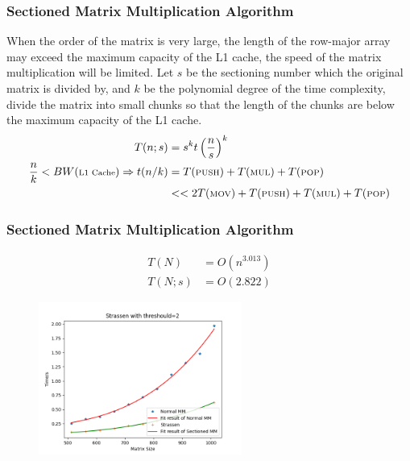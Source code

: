 \documentclass[cjk]{beamer}
\begin{document}
\begin{frame}
  \frametitle{Sectioned Matrix Multiplication Algorithm}
  When the order of the matrix is very large, the length of the row-major array may exceed the maximum capacity of the L1 cache, the speed of the matrix multiplication will be limited. Let \(s\) be the sectioning number which the original matrix is divided by, and \(k\) be the polynomial degree of the time complexity, divide the matrix into small chunks so that the length of the chunks are below the maximum capacity of the L1 cache.
  \begin{equation}
    \begin{aligned}
      T(n;s)                                                        & =s^{k}t\left(\frac{n}{s}\right)^{k}                                                                         \\
      \frac{n}{k}<BW(\text{\scriptsize L1 Cache})\Rightarrow t(n/k) & =T(\text{\scriptsize PUSH})+T(\text{\scriptsize MUL})+T(\text{\scriptsize POP})                             \\
                                                                    & <<2T(\text{\scriptsize MOV})+T(\text{\scriptsize PUSH})+T(\text{\scriptsize MUL})+T(\text{\scriptsize POP})
    \end{aligned}
  \end{equation}
\end{frame}
\begin{frame}
  \frametitle{Sectioned Matrix Multiplication Algorithm}

  \begin{equation}
    \begin{aligned}
      T(N)   & =O(n^{3.013}) \\
      T(N;s) & =O(2.822)
    \end{aligned}
  \end{equation}
  \begin{figure}[htb]
    \begin{center}
      \includegraphics[height=5.0cm]{sub_naive.png}
    \end{center}
  \end{figure}
\end{frame}
\end{document}
